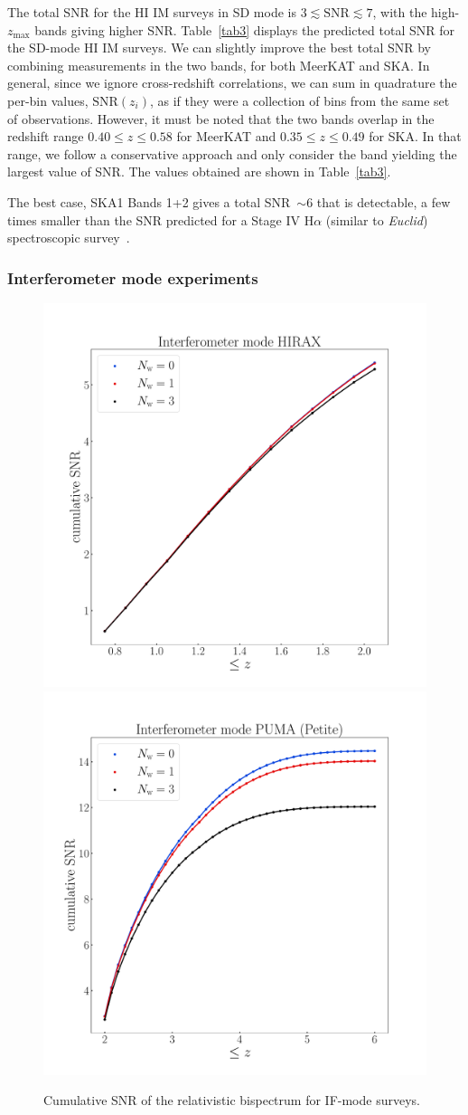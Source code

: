 The total SNR for the HI IM surveys in SD mode is {$3 \lesssim \mathrm{SNR} \lesssim 7$, with the high-$z_\mathrm{max}$ bands giving higher SNR.} 
Table~\ref{tab3} displays the predicted total SNR for the SD-mode HI IM surveys.
We can slightly improve the best total SNR by combining measurements in the two bands, for both MeerKAT and SKA.  In general, since we ignore cross-redshift correlations, we can sum in quadrature the per-bin values, $\mathrm{SNR}(z_i)$, as if they were a collection of bins from the same set of observations.
However, it must be noted that the two bands overlap in the redshift range  $0.40\leq z\leq 0.58$ for MeerKAT and $0.35\leq z \leq 0.49$ for SKA.
In that range, we follow a conservative approach and only consider the band yielding the largest value of SNR.
The values obtained are shown in Table~\ref{tab3}.

The best case, SKA1 Bands 1+2 gives a total SNR\, $\sim$6 that is detectable, a few times smaller than the SNR predicted for a Stage IV H$\alpha$ (similar to {\em Euclid}) spectroscopic survey~\cite{Maartens:2019yhx}. 
%
\subsubsection{Interferometer mode experiments}
%
\begin{figure}[ht!]
\centering
\includegraphics[width=.49\textwidth]{fig/snrInterferometerHIRAXCumDopplerBg}  
\includegraphics[width=.49\textwidth]{fig/snrInterferometerPUMAPetiteCumDopplerBg}
\caption{Cumulative SNR of the relativistic bispectrum for IF-mode surveys.}
\label{fig:imsnrres}
\end{figure}

